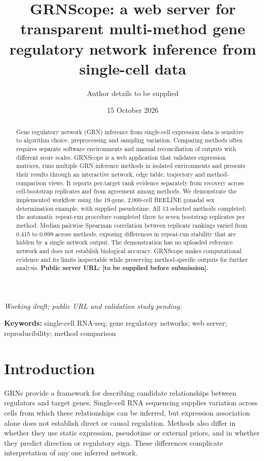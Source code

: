 \documentclass[11pt]{article}
\title{GRNScope: a web server for transparent multi-method gene regulatory network inference from single-cell data}
\author{Author details to be supplied}
\date{15 October 2026}
\begin{document}
\maketitle

\begin{center}\small\emph{Working draft; public URL and validation study pending.}\end{center}

\begin{abstract}

Gene regulatory network (GRN) inference from single-cell expression data is sensitive to algorithm choice, preprocessing and sampling variation. Comparing methods often requires separate software environments and manual reconciliation of outputs with different score scales. GRNScope is a web application that validates expression matrices, runs multiple GRN inference methods in isolated environments and presents their results through an interactive network, edge table, trajectory and method-comparison views. It reports per-target rank evidence separately from recovery across cell-bootstrap replicates and from agreement among methods. We demonstrate the implemented workflow using the 19-gene, 2,000-cell BEELINE gonadal sex determination example, with supplied pseudotime. All 13 selected methods completed; the automatic repeat-run procedure completed three to seven bootstrap replicates per method. Median pairwise Spearman correlation between replicate rankings varied from 0.415 to 0.999 across methods, exposing differences in repeat-run stability that are hidden by a single network output. The demonstration has no uploaded reference network and does not establish biological accuracy. GRNScope makes computational evidence and its limits inspectable while preserving method-specific outputs for further analysis. \textbf{Public server URL: [to be supplied before submission].}

\end{abstract}

\textbf{Keywords:} single-cell RNA-seq; gene regulatory networks; web server; reproducibility; method comparison

\section{Introduction}

GRNs provide a framework for describing candidate relationships between regulators and target genes. Single-cell RNA sequencing supplies variation across cells from which these relationships can be inferred, but expression association alone does not establish direct or causal regulation. Methods also differ in whether they use static expression, pseudotime or external priors, and in whether they predict direction or regulatory sign. These differences complicate interpretation of any one inferred network.
\end{document}
